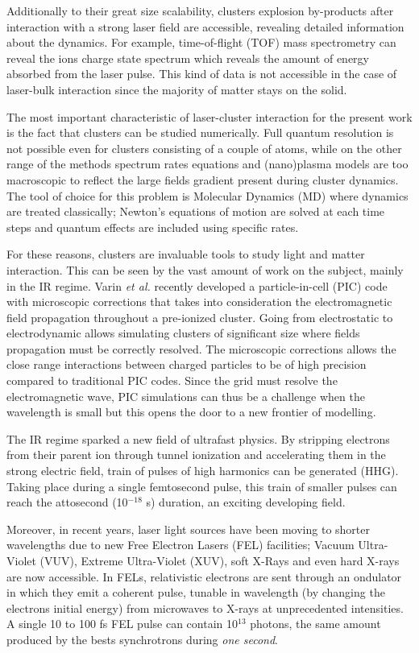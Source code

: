 Additionally to their great size scalability, clusters explosion by-products
after interaction with a strong laser field are accessible, revealing detailed
information about the dynamics. For example, time-of-flight (TOF) mass
spectrometry can reveal the ions charge state spectrum which reveals the amount
of energy absorbed from the laser pulse. This kind of data is not accessible
in the case of laser-bulk interaction since the majority of matter stays on the
solid.

The most important characteristic of laser-cluster interaction for the present
work is the fact that clusters can be studied numerically. Full quantum resolution
is not possible even for clusters consisting of a couple of atoms, while on the
other range of the methods spectrum rates equations and (nano)plasma models are
too macroscopic to reflect the large fields gradient present during cluster
dynamics\cite{Fennel2010}. The tool of choice for this problem is Molecular Dynamics
(MD) where dynamics are treated classically; Newton's equations of motion are
solved at each time steps and quantum effects are included using specific rates.

For these reasons, clusters are invaluable tools to study light and matter
interaction. This can be seen by the vast amount of work on the subject, mainly
in the IR regime\cite{Fennel2010}. Varin \textit{et al.}\cite{Varin2012} recently
developed a particle-in-cell (PIC) code with microscopic corrections that takes
into consideration the electromagnetic field propagation throughout a pre-ionized
cluster. Going from electrostatic to electrodynamic allows simulating clusters
of significant size where fields propagation must be correctly resolved. The
microscopic corrections allows the close range interactions between
charged particles to be of high precision compared to traditional PIC
codes\cite{Peltz2012}. Since the grid must resolve the electromagnetic wave,
PIC simulations can thus be a challenge when the wavelength is small but this
opens the door to a new frontier of modelling.

The IR regime sparked a new field of ultrafast physics. By stripping electrons
from their parent ion through tunnel ionization and accelerating them in the
strong electric field, train of pulses of high harmonics can be generated (HHG).
Taking place during a single femtosecond pulse, this train of smaller pulses
can reach the attosecond (10$^{-18}$ s) duration, an exciting developing field.

Moreover, in recent years, laser light sources
have been moving to shorter wavelengths due to new Free Electron Lasers (FEL)
facilities; Vacuum Ultra-Violet (VUV), Extreme Ultra-Violet (XUV), soft X-Rays
and even hard X-rays are now accessible. In FELs, relativistic electrons are sent
through an ondulator in which they emit a coherent pulse, tunable in wavelength
(by changing the electrons initial energy)
from microwaves to X-rays\cite{Brabec2009,Ackermann2007a,Pellegrini2012} at
unprecedented intensities. A single 10 to 100 fs FEL pulse can contain 10$^{13}$
photons, the same amount produced by the bests synchrotrons during
\textit{one second}\cite{Bostedt2009}.

